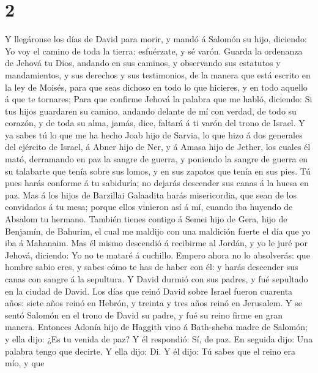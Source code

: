 \hypertarget{section-1}{%
\section{2}\label{section-1}}

 Y llegáronse los días de David para morir, y mandó á
Salomón su hijo, diciendo:  Yo voy el camino de toda la
tierra: esfuérzate, y sé varón.  Guarda la ordenanza de
Jehová tu Dios, andando en sus caminos, y observando sus estatutos y
mandamientos, y sus derechos y sus testimonios, de la manera que está
escrito en la ley de Moisés, para que seas dichoso en todo lo que
hicieres, y en todo aquello á que te tornares;  Para que
confirme Jehová la palabra que me habló, diciendo: Si tus hijos
guardaren su camino, andando delante de mí con verdad, de todo su
corazón, y de toda su alma, jamás, dice, faltará á ti varón del trono de
Israel.  Y ya sabes tú lo que me ha hecho Joab hijo de
Sarvia, lo que hizo á dos generales del ejército de Israel, á Abner hijo
de Ner, y á Amasa hijo de Jether, los cuales él mató, derramando en paz
la sangre de guerra, y poniendo la sangre de guerra en su talabarte que
tenía sobre sus lomos, y en sus zapatos que tenía en sus pies.
 Tú pues harás conforme á tu sabiduría; no dejarás descender
sus canas á la huesa en paz.  Mas á los hijos de Barzillai
Galaadita harás misericordia, que sean de los convidados á tu mesa;
porque ellos vinieron así á mí, cuando iba huyendo de Absalom tu
hermano.  También tienes contigo á Semei hijo de Gera, hijo
de Benjamín, de Bahurim, el cual me maldijo con una maldición fuerte el
día que yo iba á Mahanaim. Mas él mismo descendió á recibirme al Jordán,
y yo le juré por Jehová, diciendo: Yo no te mataré á cuchillo.
 Empero ahora no lo absolverás: que hombre sabio eres, y
sabes cómo te has de haber con él: y harás descender sus canas con
sangre á la sepultura.  Y David durmió con sus padres, y
fué sepultado en la ciudad de David.  Los días que reinó
David sobre Israel fueron cuarenta años: siete años reinó en Hebrón, y
treinta y tres años reinó en Jerusalem.  Y se sentó Salomón
en el trono de David su padre, y fué su reino firme en gran manera.
 Entonces Adonía hijo de Haggith vino á Bath-sheba madre de
Salomón; y ella dijo: ¿Es tu venida de paz? Y él respondió: Sí, de paz.
 En seguida dijo: Una palabra tengo que decirte. Y ella
dijo: Di.  Y él dijo: Tú sabes que el reino era mío, y que
